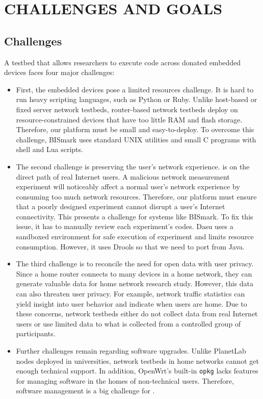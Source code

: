 \chapter{CHALLENGES AND GOALS}
\label{sec.goals_challenges}
\section{Challenges}
\label{ssec.challenges}
A testbed that allows researchers to execute code across donated embedded devices faces four major challenges:
\begin{itemize}
\item First, the embedded devices pose a limited resources challenge. It is hard to
run heavy scripting languages, such as Python or Ruby. Unlike host-based or fixed server network testbeds,
router-based network testbeds deploy on resource-constrained devices that have too little RAM and flash storage. Therefore, our platform must be small and easy-to-deploy. To overcome this challenge, BISmark uses standard UNIX utilities and small C programs with shell and Lua scripts.
\item The second challenge is preserving the user's network experience. \sysname is on the direct
path of real Internet users. A malicious network measurement experiment will noticeably
 affect a normal user's network experience by consuming too much network resources. Therefore,
  our platform must ensure that a poorly designed experiment cannot disrupt a user's
  Internet connectivity. This presents a challenge for systems like BISmark. To fix
   this issue, it has to manually review each experiment's codes. Dasu uses a sandboxed environment for safe execution of experiment and limits resource consumption. However, it uses Drools so that we need to port from Java.
\item The third challenge is to reconcile the need for open data with user privacy.
Since a home router connects to many devices in a home network, they can generate valuable data
 for home network research study. However, this data can also threaten user privacy.
 For example, network traffic statistics can yield insight into user behavior and indicate
  when users are home. Due to these concerns, network testbeds either do not collect data
   from real Internet users or use limited data to what is collected from a controlled group of
    participants.
\item Further challenges remain regarding software upgrades. Unlike PlanetLab nodes
deployed in universities, network testbeds in home networks cannot get enough technical
support. In addition, OpenWrt's built-in \texttt{opkg} lacks features for managing software in the homes of non-technical users. Therefore, software management is a big challenge for \sysname.
\end{itemize}
